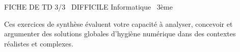 \documentclass[11pt]{article}
\begin{document}
\begin{tcolorbox}[enhanced,colback=popink,colframe=popink,arc=10pt,boxrule=0pt,left=12pt,right=12pt,top=9pt,bottom=9pt]
{\color{white}\popxbold\small FICHE DE TD 3/3 \textbullet\ DIFFICILE \hfill Informatique \textbullet\ 3ème\par}
\end{tcolorbox}
\vspace{4pt}
Ces exercices de synthèse évaluent votre capacité à analyser, concevoir et argumenter des solutions globales d'hygiène numérique dans des contextes réalistes et complexes.
\end{document}
